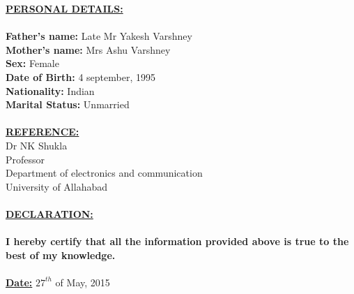 \documentclass{article}
\begin{document}
				\underline{\textbf{PERSONAL DETAILS:}}\\
				\\
				\textbf{Father's name:} Late Mr Yakesh Varshney\\
				\textbf{Mother's name:} Mrs Ashu Varshney\\
				\textbf{Sex:} Female\\
				\textbf{Date of Birth:} 4 september, 1995\\
				\textbf{Nationality:} Indian\\
				\textbf{Marital Status:} Unmarried\\
				\\
					\underline{\textbf{REFERENCE:}}
					\\[\baselineskip]
					Dr NK Shukla\\
					Professor\\
					Department of electronics and communication\\
					University of Allahabad\\
					\\
						\underline{\textbf{DECLARATION:}}\\
						\\
						\textbf{I hereby certify that all the information provided above is true to the best of my knowledge.}\\
						\\		
							\underline{\textbf{Date:}} $27^{th}$ of May, 2015
			
\end{document}
